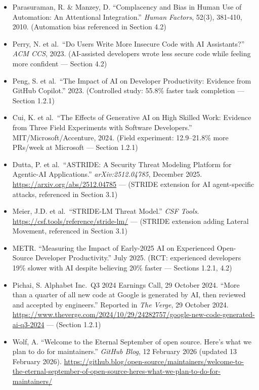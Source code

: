 \documentclass[a4paper,11pt]{report}
\begin{document}
\begin{itemize}
  Publishing, 2008. (Systems archetypes referenced in Section 4.2)
\item
  Parasuraman, R. \& Manzey, D. ``Complacency and Bias in Human Use of
  Automation: An Attentional Integration.'' \emph{Human Factors}, 52(3),
  381-410, 2010. (Automation bias referenced in Section 4.2)
\item
  Perry, N. et al.~``Do Users Write More Insecure Code with AI
  Assistants?'' \emph{ACM CCS}, 2023. (AI-assisted developers wrote less
  secure code while feeling more confident --- Section 4.2)
\item
  Peng, S. et al.~``The Impact of AI on Developer Productivity: Evidence
  from GitHub Copilot.'' 2023. (Controlled study: 55.8\% faster task
  completion --- Section 1.2.1)
\item
  Cui, K. et al.~``The Effects of Generative AI on High Skilled Work:
  Evidence from Three Field Experiments with Software Developers.''
  MIT/Microsoft/Accenture, 2024. (Field experiment: 12.9--21.8\% more
  PRs/week at Microsoft --- Section 1.2.1)
\item
  Dutta, P. et al.~``ASTRIDE: A Security Threat Modeling Platform for
  Agentic-AI Applications.'' \emph{arXiv:2512.04785}, December 2025.
  \url{https://arxiv.org/abs/2512.04785} --- (STRIDE extension for AI
  agent-specific attacks, referenced in Section 3.1)
\item
  Meier, J.D. et al.~``STRIDE-LM Threat Model.'' \emph{CSF Tools}.
  \url{https://csf.tools/reference/stride-lm/} --- (STRIDE extension
  adding Lateral Movement, referenced in Section 3.1)
\item
  METR. ``Measuring the Impact of Early-2025 AI on Experienced
  Open-Source Developer Productivity.'' July 2025. (RCT: experienced
  developers 19\% slower with AI despite believing 20\% faster ---
  Sections 1.2.1, 4.2)
\item
  Pichai, S. Alphabet Inc.~Q3 2024 Earnings Call, 29 October 2024.
  ``More than a quarter of all new code at Google is generated by AI,
  then reviewed and accepted by engineers.'' Reported in \emph{The
  Verge}, 29 October 2024.
  \url{https://www.theverge.com/2024/10/29/24282757/google-new-code-generated-ai-q3-2024}
  --- (Section 1.2.1)
\item
  Wolf, A. ``Welcome to the Eternal September of open source. Here's
  what we plan to do for maintainers.'' \emph{GitHub Blog}, 12 February
  2026 (updated 13 February 2026).
  \url{https://github.blog/open-source/maintainers/welcome-to-the-eternal-september-of-open-source-heres-what-we-plan-to-do-for-maintainers/}

\end{itemize}
\end{document}
